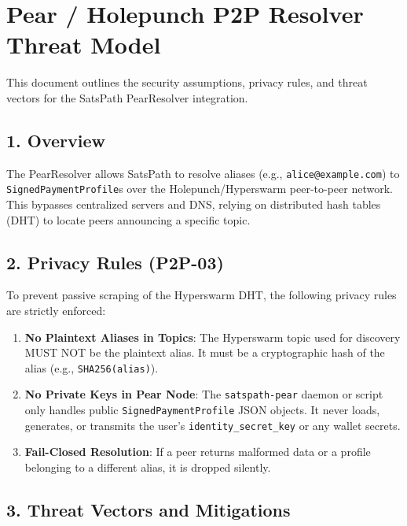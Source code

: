 \documentclass[
]{article}
\author{}
\date{}
\providecommand{\tightlist}{%
  \setlength{\itemsep}{0pt}\setlength{\parskip}{0pt}}
\begin{document}
\hypertarget{pear-holepunch-p2p-resolver-threat-model}{%
\section{Pear / Holepunch P2P Resolver Threat
Model}\label{pear-holepunch-p2p-resolver-threat-model}}

This document outlines the security assumptions, privacy rules, and
threat vectors for the SatsPath PearResolver integration.

\hypertarget{overview}{%
\subsection{1. Overview}\label{overview}}

The PearResolver allows SatsPath to resolve aliases (e.g.,
\texttt{alice@example.com}) to \texttt{SignedPaymentProfile}s over the
Holepunch/Hyperswarm peer-to-peer network. This bypasses centralized
servers and DNS, relying on distributed hash tables (DHT) to locate
peers announcing a specific topic.

\hypertarget{privacy-rules-p2p-03}{%
\subsection{2. Privacy Rules (P2P-03)}\label{privacy-rules-p2p-03}}

To prevent passive scraping of the Hyperswarm DHT, the following privacy
rules are strictly enforced:

\begin{enumerate}
\def\labelenumi{\arabic{enumi}.}
\tightlist
\item
  \textbf{No Plaintext Aliases in Topics}: The Hyperswarm topic used for
  discovery MUST NOT be the plaintext alias. It must be a cryptographic
  hash of the alias (e.g., \texttt{SHA256(alias)}).
\item
  \textbf{No Private Keys in Pear Node}: The \texttt{satspath-pear}
  daemon or script only handles public \texttt{SignedPaymentProfile}
  JSON objects. It never loads, generates, or transmits the user's
  \texttt{identity\_secret\_key} or any wallet secrets.
\item
  \textbf{Fail-Closed Resolution}: If a peer returns malformed data or a
  profile belonging to a different alias, it is dropped silently.
\end{enumerate}

\hypertarget{threat-vectors-and-mitigations}{%
\subsection{3. Threat Vectors and
Mitigations}\label{threat-vectors-and-mitigations}}
\end{document}
